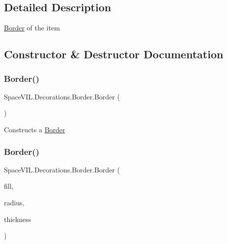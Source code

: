 \subsection{Detailed Description}
\mbox{\hyperlink{class_space_v_i_l_1_1_decorations_1_1_border}{Border}} of the item 



\subsection{Constructor \& Destructor Documentation}
\mbox{\label{class_space_v_i_l_1_1_decorations_1_1_border_af401ed881c34ee207e39331b96545211}} 
\subsubsection{\texorpdfstring{Border()}{Border()}\hspace{0.1cm}{\footnotesize\ttfamily [1/2]}}
{\footnotesize\ttfamily Space\+V\+I\+L.\+Decorations.\+Border.\+Border (\begin{DoxyParamCaption}{ }\end{DoxyParamCaption})\hspace{0.3cm}{\ttfamily [inline]}}



Constructs a \mbox{\hyperlink{class_space_v_i_l_1_1_decorations_1_1_border}{Border}} 

\mbox{\label{class_space_v_i_l_1_1_decorations_1_1_border_a11c41056821fcf5455863b0009127d2e}} 
\subsubsection{\texorpdfstring{Border()}{Border()}\hspace{0.1cm}{\footnotesize\ttfamily [2/2]}}
{\footnotesize\ttfamily Space\+V\+I\+L.\+Decorations.\+Border.\+Border (\begin{DoxyParamCaption}\item[{Color}]{fill,  }\item[{\mbox{\hyperlink{class_space_v_i_l_1_1_decorations_1_1_corner_radius}{Corner\+Radius}}}]{radius,  }\item[{int}]{thickness }\end{DoxyParamCaption})\hspace{0.3cm}{\ttfamily [inline]}}




